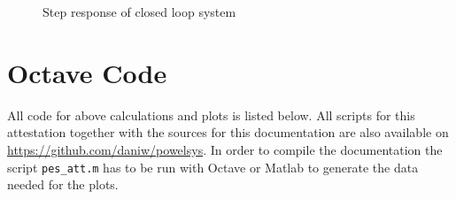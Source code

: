 \documentclass[a4paper,11pt,fleqn]{article}
\begin{document}
\clearpage

\begin{figure}[h!]
    \centering
    \caption{Step response of closed loop system}
    \label{fig:step_gh}
\end{figure}

\clearpage

\appendix
\section{Octave Code}
All code for above calculations and plots is listed below. All scripts for 
this attestation together with the sources for this documentation are also 
available on \url{https://github.com/daniw/powelsys}. In order to compile the 
documentation the script \verb!pes_att.m! has to be run with Octave or Matlab 
to generate the data needed for the plots. 

\end{document}
